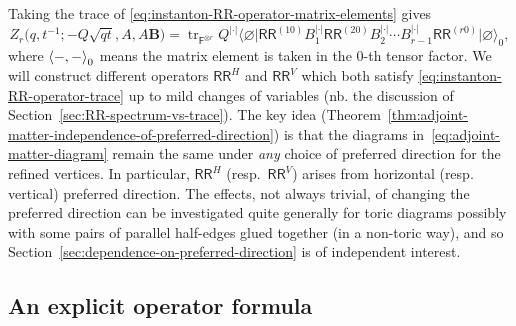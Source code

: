 \documentclass[pdftex]{sigma}%
\numberwithin{equation}{section}
\renewcommand{\vec}[1]{\bm{#1}}
\newcommand{\sF}{\mathsf{F}}
\newcommand{\sRR}{\mathsf{RR}}
\DeclareMathOperator{\tr}{tr}
\DeclarePairedDelimiter{\inner}{\langle}{\rangle}
\begin{document}
\begin{MyParagraph}
Taking the trace of \eqref{eq:instanton-RR-operator-matrix-elements}
gives
\begin{equation} \label{eq:instanton-RR-operator-trace}
 Z_r\big(q,t^{-1}; -Q\sqrt{qt}, A, A\vec B\big) = \tr_{\sF^{\otimes r}} Q^{|\cdot|} \big\langle\varnothing \big| \sRR^{(10)} B_1^{|\cdot|} \sRR^{(20)} B_2^{|\cdot|} \cdots B_{r-1}^{|\cdot|} \sRR^{(r0)} \big| \varnothing\big\rangle_0,
\end{equation}
where $\inner*{-, -}_0$ means the matrix element is taken in the
$0$-th tensor factor. We will construct different operators $\sRR^H$
and $\sRR^V$ which both satisfy \eqref{eq:instanton-RR-operator-trace}
up to mild changes of variables (nb. the discussion of
Section~\ref{sec:RR-spectrum-vs-trace}). The key idea
(Theorem~\ref{thm:adjoint-matter-independence-of-preferred-direction})
is that the diagrams in~\eqref{eq:adjoint-matter-diagram} remain the
same under {\it any} choice of preferred direction for the refined
vertices. In particular, $\sRR^H$ (resp.~$\sRR^V$) arises from
horizontal (resp. vertical) preferred direction. The effects, not
always trivial, of changing the preferred direction can be
investigated quite generally for toric diagrams possibly with some
pairs of parallel half-edges glued together (in a non-toric way), and
so Section~\ref{sec:dependence-on-preferred-direction} is of independent interest.
\end{MyParagraph}

\subsection{An explicit operator formula}
\label{sec:explicit-operator-formula}
\end{document}
